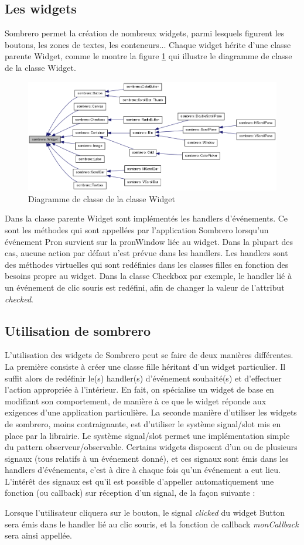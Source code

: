 \subsection{Les widgets}
Sombrero permet la création de nombreux widgets, parmi lesquels figurent les boutons, les zones de textes, les conteneurs... Chaque widget hérite d'une classe parente Widget, comme le montre la figure \ref{fig:classDiagWidget} qui illustre le diagramme de classe de la classe Widget.
\begin{figure}[H]
  \centering
  \includegraphics[width=17cm]{images/classDiagWidget.png}
  \caption{Diagramme de classe de la classe Widget}
  \label{fig:classDiagWidget}
\end{figure}
Dans la classe parente Widget sont implémentés les handlers d'événements. Ce sont les méthodes qui sont appellées par l'application Sombrero lorsqu'un événement Pron survient sur la pronWindow liée au widget. Dans la plupart des cas, aucune action par défaut n'est prévue dans les handlers. Les handlers sont des méthodes virtuelles qui sont redéfinies dans les classes filles en fonction des besoins propre au widget. Dans la classe Checkbox par exemple, le handler lié à un événement de clic souris est redéfini, afin de changer la valeur de l'attribut \textit{checked}.
\subsection{Utilisation de sombrero}
L'utilisation des widgets de Sombrero peut se faire de deux manières différentes. 
La première consiste à créer une classe fille héritant d'un widget particulier. Il suffit alors de redéfinir le(s) handler(s) d'événement souhaité(s) et d'effectuer l'action appropriée à l'intérieur. En fait, on spécialise un widget de base en modifiant son comportement, de manière à ce que le widget réponde aux exigences d'une application particulière.
La seconde manière d'utiliser les widgets de sombrero, moins contraignante, est d'utiliser le système signal/slot mis en place par la librairie. Le système signal/slot permet une implémentation simple du pattern observeur/observable. Certains widgets disposent d'un ou de plusieurs signaux (tous relatifs à un événement donné), et ces signaux sont émis dans les handlers d'événements, c'est à dire à chaque fois qu'un événement a eut lieu. L'intérêt des signaux est qu'il est possible d'appeller automatiquement une fonction (ou callback) sur réception d'un signal, de la façon suivante :

Lorsque l'utilisateur cliquera sur le bouton, le signal \textit{clicked} du widget Button sera émis dans le handler lié au clic souris, et la fonction de callback \textit{monCallback} sera ainsi appellée.

